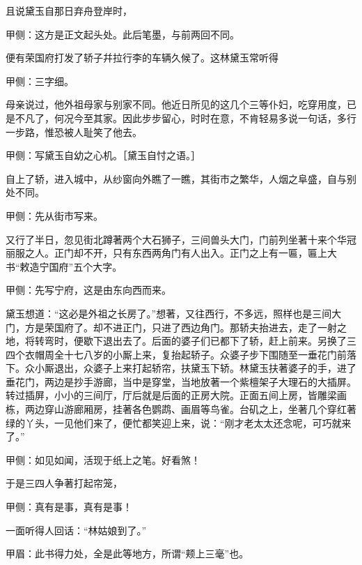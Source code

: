 \begin{parag}
    且说黛玉自那日弃舟登岸时，\begin{note}甲侧：这方是正文起头处。此后笔墨，与前两回不同。\end{note}便有荣国府打发了轿子幷拉行李的车辆久候了。这林黛玉常听得\begin{note}甲侧：三字细。\end{note}母亲说过，他外祖母家与别家不同。他近日所见的这几个三等仆妇，吃穿用度，已是不凡了，何况今至其家。因此步步留心，时时在意，不肯轻易多说一句话，多行一步路，惟恐被人耻笑了他去。\begin{note}甲侧：写黛玉自幼之心机。［黛玉自忖之语。］\end{note}自上了轿，进入城中，从纱窗向外瞧了一瞧，其街市之繁华，人烟之阜盛，自与别处不同。\begin{note}甲侧：先从街市写来。\end{note}又行了半日，忽见街北蹲著两个大石狮子，三间兽头大门，门前列坐著十来个华冠丽服之人。正门却不开，只有东西两角门有人出入。正门之上有一匾，匾上大书“敕造宁国府”五个大字。\begin{note}甲侧：先写宁府，这是由东向西而来。\end{note}黛玉想道：“这必是外祖之长房了。”想著，又往西行，不多远，照样也是三间大门，方是荣国府了。却不进正门，只进了西边角门。那轿夫抬进去，走了一射之地，将转弯时，便歇下退出去了。后面的婆子们已都下了轿，赶上前来。另换了三四个衣帽周全十七八岁的小厮上来，复抬起轿子。众婆子步下围随至一垂花门前落下。众小厮退出，众婆子上来打起轿帘，扶黛玉下轿。林黛玉扶著婆子的手，进了垂花门，两边是抄手游廊，当中是穿堂，当地放著一个紫檀架子大理石的大插屏。转过插屏，小小的三间厅，厅后就是后面的正房大院。正面五间上房，皆雕梁画栋，两边穿山游廊厢房，挂著各色鹦鹉、画眉等鸟雀。台矶之上，坐著几个穿红著绿的丫头，一见他们来了，便忙都笑迎上来，说：“刚才老太太还念呢，可巧就来了。”\begin{note}甲侧：如见如闻，活现于纸上之笔。好看煞！\end{note}于是三四人争著打起帘笼，\begin{note}甲侧：真有是事，真有是事！\end{note}一面听得人回话：“林姑娘到了。”\begin{note}甲眉：此书得力处，全是此等地方，所谓“颊上三毫”也。\end{note}
\end{parag}


